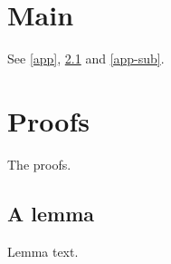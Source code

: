 \documentclass{article}
\begin{document}
\tableofcontents
\section{Main}
See \autoref{app}, \ref{app-sub} and \autoref{app-sub}.
\appendix
\section{Proofs}\label{app}
The proofs.
\subsection{A lemma}\label{app-sub}
Lemma text.
\end{document}
